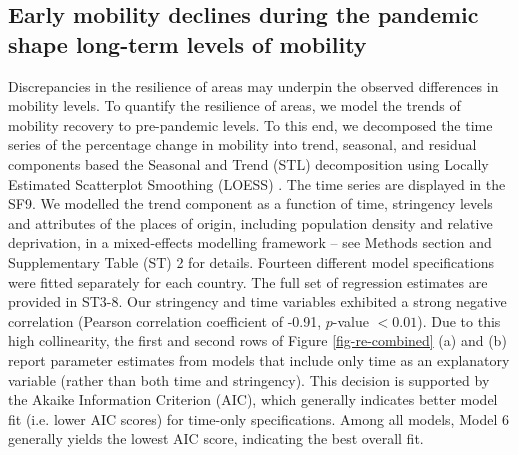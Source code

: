 \documentclass[fleqn,10pt]{wlscirep}
\begin{document}


\subsection*{Early mobility declines during the pandemic shape long-term levels of mobility}

Discrepancies in the resilience of areas may underpin the observed differences in mobility levels. To quantify the resilience of areas, we model the trends of mobility recovery to pre-pandemic levels. To this end, we decomposed the time series of the percentage change in mobility into trend, seasonal, and residual components based the Seasonal and Trend (STL) decomposition using Locally Estimated Scatterplot Smoothing (LOESS) \cite{cleveland1990stl}. The time series are displayed in the SF9. We modelled the trend component as a function of time, stringency levels and attributes of the places of origin, including population density and relative deprivation, in a mixed-effects modelling framework – see Methods section and Supplementary Table (ST) 2 for details. Fourteen different model specifications were fitted separately for each country. The full set of regression estimates are provided in ST3-8. Our stringency and time variables exhibited a strong negative correlation (Pearson correlation coefficient of -0.91, $p$-value $< 0.01$). Due to this high collinearity, the first and second rows of Figure \ref{fig-re-combined} (a) and (b) report parameter estimates from models that include only time as an explanatory variable (rather than both time and stringency). This decision is supported by the Akaike Information Criterion (AIC), which generally indicates better model fit (i.e. lower AIC scores) for time-only specifications. Among all models, Model 6 generally yields the lowest AIC score, indicating the best overall fit.
\end{document}
